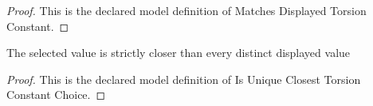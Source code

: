 \begin{proof}
  This is the declared model definition of Matches Displayed Torsion Constant.
\end{proof}
\begin{definition}
  \label{def:physics:phyx-mini-0270:phyxminiproblems-problemphyxmini0270-isuniqueclosesttorsionconstantchoice}
  The selected value is strictly closer than every distinct displayed value
\end{definition}
\begin{proof}
  This is the declared model definition of Is Unique Closest Torsion Constant Choice.
\end{proof}
